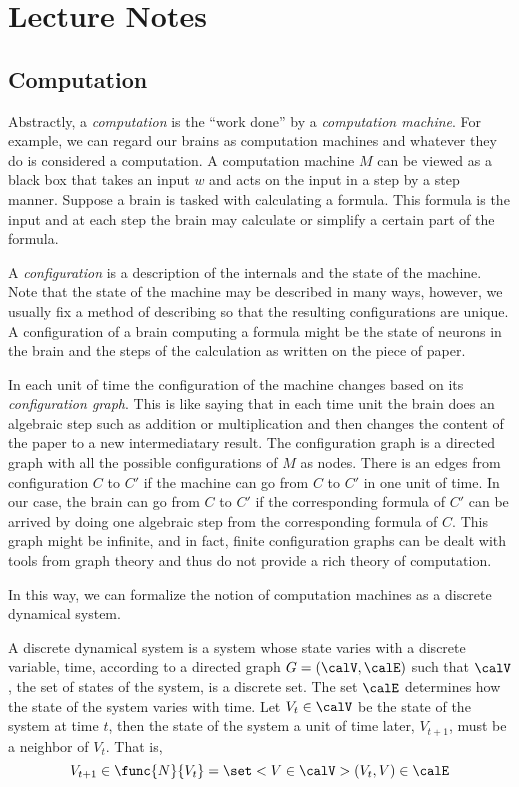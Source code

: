 \chapter{Lecture Notes}
\section{Computation}
Abstractly, a \textit{computation} is the ``work done'' by a \textit{computation machine}. For example, we can regard our brains as computation machines and whatever they do is considered a computation. A computation machine \(M\) can be viewed as a black box that takes an input \(w\) and acts on the input in a step by a step manner. Suppose a brain is tasked with calculating a formula. This formula is the input and at each step the brain may calculate or simplify a certain part of the formula. 

A \textit{configuration} is a description of the internals and the state of the machine. Note that the state of the machine may be described in many ways, however, we usually fix a method of describing so that the resulting configurations are unique. A configuration of a brain computing a formula might be the state of neurons in the brain and the steps of the calculation as written on the piece of paper.

In each unit of time the configuration of the machine changes based on its \textit{configuration graph}. This is like saying that in each time unit the brain does an algebraic step such as addition or multiplication and then changes the content of the paper to a new intermediatary result. The configuration graph is a directed graph with all the possible configurations of \(M\) as nodes. There is an edges from configuration \(C\) to \(C'\) if the machine can go from \(C\) to \(C'\) in one unit of time. In our case, the brain can go from \(C\) to \(C'\) if the corresponding formula of \(C'\) can be arrived by doing one algebraic step from the corresponding formula of \(C\). This graph might be infinite, and in fact, finite configuration graphs can be dealt with tools from graph theory and thus do not provide a rich theory of computation.

In this way, we can formalize the notion of computation machines as a discrete dynamical system. 

\begin{definition}
    A discrete dynamical system is a system whose state varies with a discrete variable, time, according to a directed graph \(G = (\calV,\calE)\) such that \(\calV\), the set of states of the system, is a discrete set. The set \(\calE\) determines how the state of the system varies with time. Let \(V_t \in \calV\) be the state of the system at time \(t\), then the state of the system a unit of time later, \(V_{t+1}\), must be a neighbor of \(V_t\). That is,
    \begin{equation*}
        V_{t+1} \in \func{N}{V_t} = \set<V \in \calV>{(V_t, V) \in \calE}
    \end{equation*}
\end{definition}

